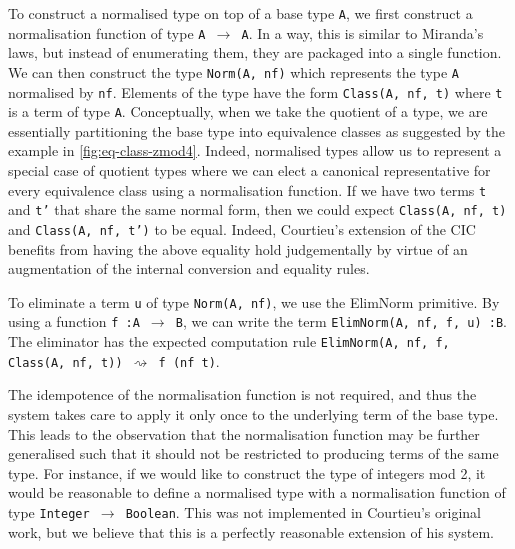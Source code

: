 \documentclass[12pt,twoside,maitrise]{dms}
\theoremstyle{definition}
\numberwithin{equation}{section}
\numberwithin{table}{chapter}
\numberwithin{figure}{chapter}
\newcommand\kw[1] {\textsf{#1}}
\newcommand\id[1] {\texttt{#1}}
\newcommand\fn[1] {\texttt{#1}}
\begin{document}
To construct a normalised type on top of a base type \id{A}, we first construct
a normalisation function of type \fn{A $\rightarrow$ A}. In a way, this is
similar to Miranda's laws, but instead of enumerating them, they are packaged
into a single function. We can then construct the type \fn{\kw{Norm}(A, nf)}
which represents the type \id{A} normalised by \id{nf}. Elements of the type
have the form \fn{\kw{Class}(A, nf, t)} where \id{t} is a term of type \id{A}.
Conceptually, when we take the quotient of a type, we are essentially
partitioning the base type into equivalence classes as suggested by the example
in \autoref{fig:eq-class-zmod4}. Indeed, normalised types allow us to represent
a special case of quotient types where we can elect a canonical representative
for every equivalence class using a normalisation function. If we have two terms
\id{t} and \id{t'} that share the same normal form, then we could expect
\fn{\kw{Class}(A, nf, t)} and \fn{\kw{Class}(A, nf, t')} to be equal. Indeed,
Courtieu's extension of the CIC benefits from having the above equality hold
judgementally by virtue of an augmentation of the internal conversion and
equality rules.

To eliminate a term \id{u} of type \fn{\kw{Norm}(A, nf)}, we use the
\kw{ElimNorm} primitive. By using a function \fn{f :\@ A $\rightarrow$ B},
we can write the term \fn{\kw{ElimNorm}(A, nf, f, u) :\@ B}. The eliminator
has the expected computation rule \fn{\kw{ElimNorm}(A, nf, f, \kw{Class}(A, nf,
  t)) $\rightsquigarrow{}$ f (nf t)}.

The idempotence of the normalisation function is not required, and thus the
system takes care to apply it only once to the underlying term of the base type.
This leads to the observation that the normalisation function may be further
generalised such that it should not be restricted to producing terms of the same
type. For instance, if we would like to construct the type of integers mod 2, it
would be reasonable to define a normalised type with a normalisation function of
type \fn{Integer $\rightarrow$ Boolean}. This was not implemented in Courtieu's
original work, but we believe that this is a perfectly reasonable extension of
his system.
\end{document}

